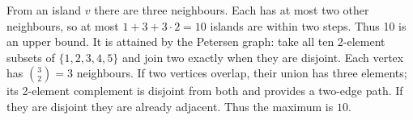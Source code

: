 From an island $v$ there are three neighbours. Each has at most two other neighbours, so at most $1+3+3\cdot2=10$ islands are within two steps. Thus 10 is an upper bound. It is attained by the Petersen graph: take all ten 2-element subsets of $\{1,2,3,4,5\}$ and join two exactly when they are disjoint. Each vertex has $\binom32=3$ neighbours. If two vertices overlap, their union has three elements; its 2-element complement is disjoint from both and provides a two-edge path. If they are disjoint they are already adjacent. Thus the maximum is $\boxed{10}$.
